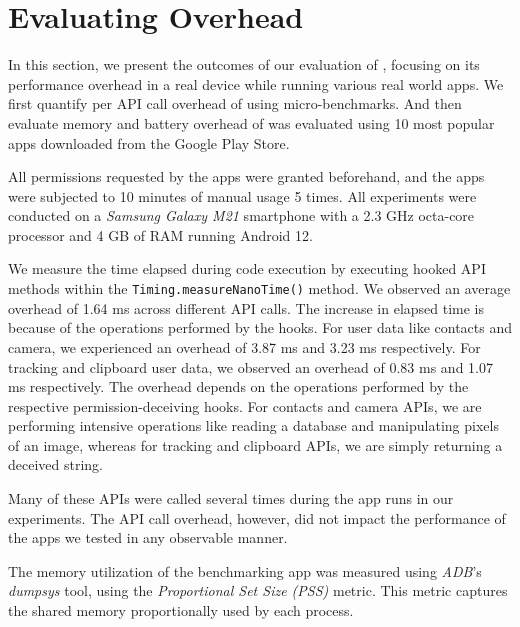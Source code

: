 \section{Evaluating Overhead}
\label{sec:results}

In this section, we present the outcomes of our evaluation of \framework{}, focusing on its performance overhead in a real device while running various real world apps.  We first quantify per API call overhead of \framework{} using micro-benchmarks. And then evaluate memory and battery overhead of \framework{} was evaluated using 10 most popular apps downloaded from the Google Play Store.

All permissions requested by the apps were granted beforehand, and the apps were subjected to 10 minutes of manual usage 5 times. All experiments were conducted on a \textit{Samsung Galaxy M21} smartphone with a 2.3 GHz octa-core processor and 4 GB of RAM running Android 12. 

We measure the time elapsed during code execution by executing hooked API methods within the \texttt{Timing.measureNanoTime()} method. We observed an average overhead of 1.64 ms across different API calls. The increase in elapsed time is because of the operations performed by the hooks. For user data like contacts and camera, we experienced an overhead of 3.87 ms and 3.23 ms respectively. For tracking and clipboard user data, we observed an overhead of 0.83 ms and 1.07 ms respectively. The overhead depends on the operations performed by the respective permission-deceiving hooks. For contacts and camera APIs, we are performing intensive operations like reading a database and manipulating pixels of an image, whereas for tracking and clipboard APIs, we are simply returning a deceived string.

Many of these APIs were called several times during the app runs in our experiments. The API call overhead, however, did not impact the performance of the apps we tested in any observable manner.

The memory utilization of the benchmarking app was measured using \textit{ADB}'s \textit{dumpsys} tool, using the \textit{Proportional Set Size (PSS)} metric. This metric captures the shared memory proportionally used by each process.

